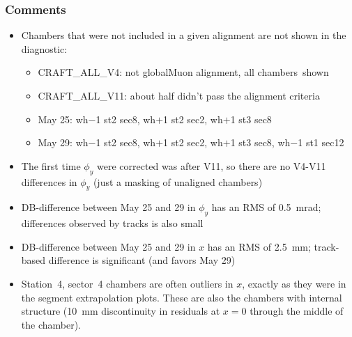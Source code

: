 \documentclass[compress]{beamer}
\begin{document}
\begin{frame}
\frametitle{Comments}
\begin{itemize}
\item Chambers that were not included in a given alignment are not shown in the diagnostic:
\begin{itemize}
\item CRAFT\_ALL\_V4: not globalMuon alignment, all \mbox{chambers shown\hspace{-1 cm}}
\item CRAFT\_ALL\_V11: about half didn't pass the alignment criteria
\item May 25: wh$-$1 st2 sec8, wh$+$1 st2 sec2, wh$+$1 st3 sec8
\item May 29: wh$-$1 st2 sec8, wh$+$1 st2 sec2, wh$+$1 st3 sec8, wh$-$1 st1 sec12
\end{itemize}

\item The first time $\phi_y$ were corrected was after V11, so there
  are no V4-V11 differences in $\phi_y$ (just a masking of unaligned chambers)

\item DB-difference between May 25 and 29 in $\phi_y$ has an RMS of
  0.5~mrad; differences observed by tracks is also small

\item DB-difference between May 25 and 29 in $x$ has an RMS of
  2.5~mm; track-based difference is significant (and favors May 29)

\item Station~4, sector~4 chambers are often outliers in $x$, exactly
  as they were in the segment extrapolation plots.  These are also the
  chambers with internal structure (10~mm discontinuity in residuals
  at $x=0$ through the middle of the chamber).
\end{itemize}
\end{frame}


\end{document}
